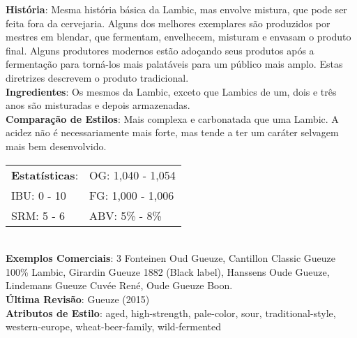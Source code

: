 \textbf{História}: Mesma história básica da Lambic, mas envolve mistura, que pode ser feita fora da cervejaria. Alguns dos melhores exemplares são produzidos por mestres em blendar, que fermentam, envelhecem, misturam e envasam o produto final. Alguns produtores modernos estão adoçando seus produtos após a fermentação para torná-los mais palatáveis para um público mais amplo. Estas diretrizes descrevem o produto tradicional. \\
\textbf{Ingredientes}: Os mesmos da Lambic, exceto que Lambics de um, dois e três anos são misturadas e depois armazenadas. \\
\textbf{Comparação de Estilos}: Mais complexa e carbonatada que uma Lambic. A acidez não é necessariamente mais forte, mas tende a ter um caráter selvagem mais bem desenvolvido. \\
\begin{tabular}{@{}p{35mm}p{35mm}@{}}
  \textbf{Estatísticas}: & OG: 1,040 - 1,054 \\
  IBU: 0 - 10  & FG: 1,000 - 1,006  \\
  SRM: 5 - 6  & ABV: 5\% - 8\%
\end{tabular}\\
\textbf{Exemplos Comerciais}: 3 Fonteinen Oud Gueuze, Cantillon Classic Gueuze 100\% Lambic, Girardin Gueuze 1882 (Black label), Hanssens Oude Gueuze, Lindemans Gueuze Cuvée René, Oude Gueuze Boon. \\
\textbf{Última Revisão}: Gueuze (2015) \\
\textbf{Atributos de Estilo}: aged, high-strength, pale-color, sour, traditional-style, western-europe, wheat-beer-family, wild-fermented
